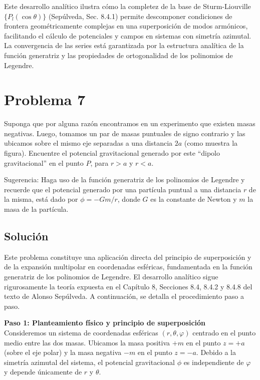 \documentclass[a4paper]{article}
\begin{document}
Este desarrollo analítico ilustra cómo la completez de la base de Sturm-Liouville $\{P_l(\cos\theta)\}$ (Sepúlveda, Sec. 8.4.1) permite descomponer condiciones de frontera geométricamente complejas en una superposición de modos armónicos, facilitando el cálculo de potenciales y campos en sistemas con simetría azimutal. La convergencia de las series está garantizada por la estructura analítica de la función generatriz y las propiedades de ortogonalidad de los polinomios de Legendre.


\section{Problema 7}
Suponga que por alguna razón encontramos en un experimento que existen masas negativas. Luego, tomamos un par de masas puntuales de signo contrario y las ubicamos sobre el mismo eje separadas a una distancia $2a$ (como muestra la figura). Encuentre el potencial gravitacional generado por este ``dipolo gravitacional'' en el punto $P$, para $r> a$ y $r< a$.

Sugerencia: Haga uso de la función generatriz de los polinomios de Legendre y recuerde que el potencial generado por una partícula puntual a una distancia $r$ de la misma, está dado por $\phi= -Gm/r$, donde $G$ es la constante de Newton y $m$ la masa de la partícula.

\subsection{Solución}
Este problema constituye una aplicación directa del principio de superposición y de la expansión multipolar en coordenadas esféricas, fundamentada en la función generatriz de los polinomios de Legendre. El desarrollo analítico sigue rigurosamente la teoría expuesta en el Capítulo 8, Secciones 8.4, 8.4.2 y 8.4.8 del texto de Alonso Sepúlveda. A continuación, se detalla el procedimiento paso a paso.

\vspace{0.3cm}
\noindent\textbf{Paso 1: Planteamiento físico y principio de superposición}\\
Consideremos un sistema de coordenadas esféricas $(r, \theta, \varphi)$ centrado en el punto medio entre las dos masas. Ubicamos la masa positiva $+m$ en el punto $z = +a$ (sobre el eje polar) y la masa negativa $-m$ en el punto $z = -a$. Debido a la simetría azimutal del sistema, el potencial gravitacional $\phi$ es independiente de $\varphi$ y depende únicamente de $r$ y $\theta$.
\end{document}
